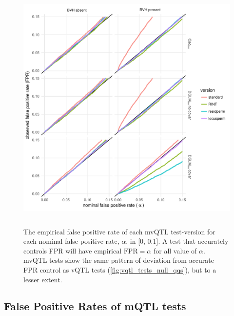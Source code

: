   \begin{figure}[hp]
      \centering
      \includegraphics[height = 5in]{images/mvqtl_null_qqs.pdf}
      \caption[
        The empirical false positive rate of each mvQTL test-version for each nominal false positive rate, $\alpha$, in {[}0, 0.1{]}.
      ]
      {
        The empirical false positive rate of each mvQTL test-version for each nominal false positive rate, $\alpha$, in {[}0, 0.1{]}.
        A test that accurately controls FPR will have $\text{empirical FPR}=\alpha$ for all value of $\alpha$.
        mvQTL tests show the same pattern of deviation from accurate FPR control as vQTL tests (\autoref{fig:vqtl_tests_null_qqs}), but to a lesser extent.
      }
      \label{fig:mvqtl_tests_null_qqs}
  \end{figure}

\FloatBarrier
\clearpage
\subsection{False Positive Rates of mQTL tests}

  \renewcommand{\arraystretch}{1.0}

